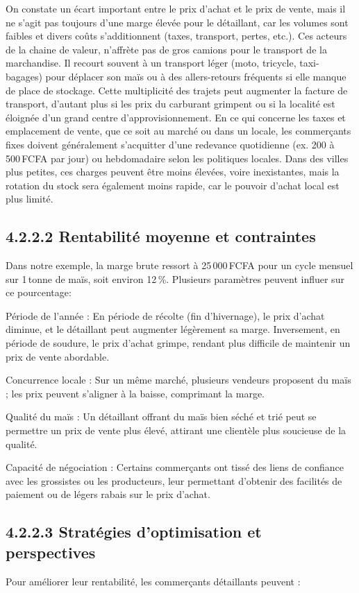 \documentclass[12pt,oneside]{report}
\begin{document}
On constate un écart important entre le prix d’achat et le prix de vente, mais il ne s’agit pas toujours d’une marge élevée pour le détaillant, car les volumes sont faibles et divers coûts s’additionnent (taxes, transport, pertes, etc.). Ces acteurs de la chaine de valeur, n’affrète pas de gros camions pour le transport de la marchandise. Il recourt souvent à un transport léger (moto, tricycle, taxi-bagages) pour déplacer son maïs ou à des allers-retours fréquents si elle manque de place de stockage. Cette multiplicité des trajets peut augmenter la facture de transport, d’autant plus si les prix du carburant grimpent ou si la localité est éloignée d’un grand centre d’approvisionnement. En ce qui concerne les taxes et emplacement de vente, que ce soit au marché ou dans un locale, les commerçants fixes doivent généralement s’acquitter d’une redevance quotidienne (ex. 200 à 500 FCFA par jour) ou hebdomadaire selon les politiques locales. Dans des villes plus petites, ces charges peuvent être moins élevées, voire inexistantes, mais la rotation du stock sera également moins rapide, car le pouvoir d’achat local est plus limité.

\subsection{4.2.2.2 Rentabilité moyenne et contraintes}
Dans notre exemple, la marge brute ressort à 25 000 FCFA pour un cycle mensuel sur 1 tonne de maïs, soit environ 12 \%.  Plusieurs paramètres peuvent influer sur ce pourcentage:

Période de l’année : En période de récolte (fin d’hivernage), le prix d’achat diminue, et le détaillant peut augmenter légèrement sa marge. Inversement, en période de soudure, le prix d’achat grimpe, rendant plus difficile de maintenir un prix de vente abordable.

Concurrence locale : Sur un même marché, plusieurs vendeurs proposent du maïs ; les prix peuvent s’aligner à la baisse, comprimant la marge.

Qualité du maïs : Un détaillant offrant du maïs bien séché et trié peut se permettre un prix de vente plus élevé, attirant une clientèle plus soucieuse de la qualité.

Capacité de négociation : Certains commerçants ont tissé des liens de confiance avec les grossistes ou les producteurs, leur permettant d’obtenir des facilités de paiement ou de légers rabais sur le prix d’achat.

\subsection{4.2.2.3 Stratégies d’optimisation et perspectives}
Pour améliorer leur rentabilité, les commerçants détaillants peuvent :
\end{document}
